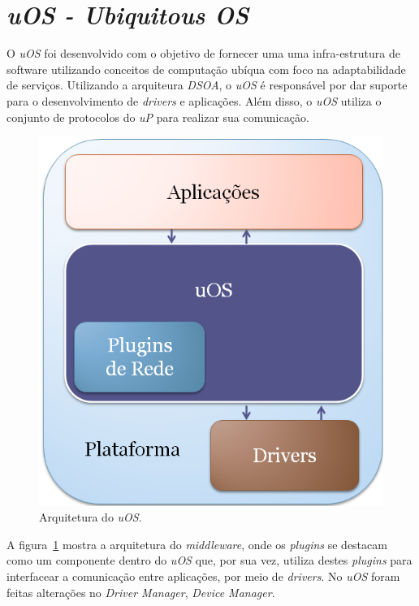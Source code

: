 \section{\emph{uOS - Ubiquitous OS}}

O \emph{uOS} foi desenvolvido com o objetivo de fornecer uma uma infra-estrutura de software utilizando conceitos de computação ubíqua com foco na adaptabilidade de serviços. Utilizando a arquiteura \emph{DSOA}, o \emph{uOS} é responsável por dar suporte para o desenvolvimento de \emph{drivers} e aplicações. Além disso, o \emph{uOS} utiliza o conjunto de protocolos do \emph{uP} para realizar sua comunicação.

\begin{figure}[ht]
	\center
	\includegraphics[scale=0.4]{imagens/ecossistemaUbiquitos}
	\caption{Arquitetura do \emph{uOS}.}
	\label{fig:ecossistemaUbiquitos}
\end{figure}

A figura~\ref{fig:ecossistemaUbiquitos} mostra a arquitetura do \emph{middleware}, onde os \emph{plugins} se destacam como um componente dentro do \emph{uOS} que, por sua vez, utiliza destes \emph{plugins} para interfacear a comunicação entre aplicações, por meio de \emph{drivers}. No \emph{uOS} foram feitas alterações no \emph{Driver Manager}, \emph{Device Manager}.


